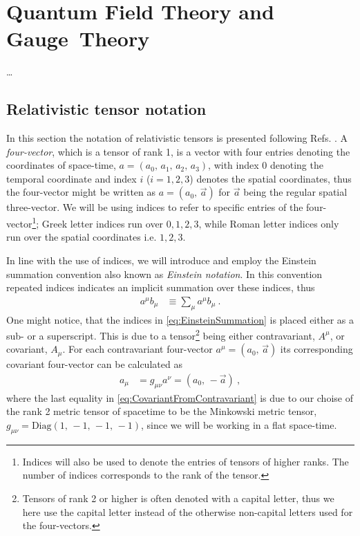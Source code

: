 \documentclass[../main.tex]{subfiles} %
\begin{document}
\chapter{Quantum Field Theory and Gauge~Theory} \label{chap:ContinuumQFT}

\ldots




\section{Relativistic tensor notation}

In this section the notation of relativistic tensors is presented following Refs. \cite{peskin_introToQFT_1995,Uggerhoej_SpecielRelativitetsteori_2016}. A \emph{four-vector}, which is a tensor of rank 1, is a vector with four entries denoting the coordinates of space-time, $a = (a_0,\, a_1,\, a_2,\, a_3)$, with index $0$ denoting the temporal coordinate and index $i$ ($i = 1,2,3$) denotes the spatial coordinates, thus the four-vector might be written as $a = (a_0,\, \Vec{a})$ for $\Vec{a}$ being the regular spatial three-vector. We will be using indices to refer to specific entries of the four-vector\footnote{Indices will also be used to denote the entries of tensors of higher ranks. The number of indices corresponds to the rank of the tensor.}; Greek letter indices run over $0,1,2,3$, while Roman letter indices only run over the spatial coordinates i.e. $1,2,3$.

In line with the use of indices, we will introduce and employ the Einstein summation convention also known as \emph{Einstein notation}. In this convention repeated indices indicates an implicit summation over these indices, thus
\begin{align} \label{eq:EinsteinSummation}
    a^\mu b_\mu &\equiv \sum_\mu a^\mu b_\mu \: .
\end{align}
One might notice, that the indices in \cref{eq:EinsteinSummation} is placed either as a sub- or a superscript. This is due to a tensor\footnote{Tensors of rank 2 or higher is often denoted with a capital letter, thus we here use the capital letter instead of the otherwise non-capital letters used for the four-vectors.} being either contravariant, $A^\mu$, or covariant, $A_\mu$. For each contravariant four-vector $a^\mu = (a_0,\, \Vec{a})$ its corresponding covariant four-vector can be calculated as
\begin{align} \label{eq:CovariantFromContravariant}
    a_\mu &= g_{\mu\nu}a^\nu = (a_0,\, -\Vec{a}) \: ,
\end{align}
where the last equality in \cref{eq:CovariantFromContravariant} is due to our choise of the rank 2 metric tensor of spacetime to be the Minkowski metric tensor, $g_{\mu\nu} = \text{Diag}(1,\, -1,\, -1,\, -1)$, since we will be working in a flat space-time.
\end{document}
